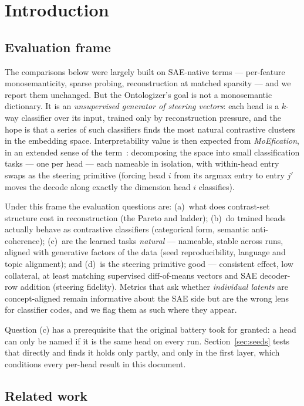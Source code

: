 \section{Introduction}

\subsection{Evaluation frame}

The comparisons below were largely built on SAE-native terms ---
per-feature monosemanticity, sparse probing, reconstruction at matched
sparsity --- and we report them unchanged. But the Ontologizer's goal is
not a monosemantic dictionary. It is an \emph{unsupervised generator of
steering vectors}: each head is a $k$-way classifier over its input,
trained only by reconstruction pressure, and the hope is that a series of
such classifiers finds the most natural contrastive clusters in the
embedding space. Interpretability value is then expected from
\emph{MoEfication}, in an extended sense of the term~\cite{zhang2022}:
decomposing the space into small classification tasks
--- one per head --- each nameable in isolation, with within-head entry
swaps as the steering primitive (forcing head $i$ from its argmax entry to
entry $j'$ moves the decode along exactly the dimension head $i$
classifies).

Under this frame the evaluation questions are: (a)~what does contrast-set
structure cost in reconstruction (the Pareto and ladder); (b)~do trained
heads actually behave as contrastive classifiers (categorical form,
semantic anti-coherence); (c)~are the learned tasks \emph{natural} ---
nameable, stable across runs, aligned with generative factors of the data
(seed reproducibility, language and topic alignment); and (d)~is the
steering primitive good --- consistent effect, low collateral, at least
matching supervised diff-of-means vectors and SAE decoder-row addition
(steering fidelity). Metrics that ask whether \emph{individual latents}
are concept-aligned remain informative about the SAE side but are the
wrong lens for classifier codes, and we flag them as such where they
appear.

Question (c) has a prerequisite that the original battery took for
granted: a head can only be named if it is the same head on every run.
Section~\ref{sec:seeds} tests that directly and finds it holds only
partly, and only in the first layer, which conditions every per-head
result in this document.


\subsection{Related work}


